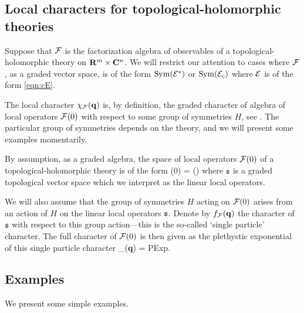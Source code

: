\subsection{Local characters for topological-holomorphic theories}\label{s:localchar}

Suppose that $\mathcal F$ is the factorization algebra of observables of a topological-holomorphic theory on $\mathbf{R}^m \times \mathbf{C}^n$. 
We will restrict our attention to cases where $\mathcal F$, as a graded vector space, is of the form $\operatorname{Sym}(\mathcal E^*)$ or $\operatorname{Sym}(\mathcal E_c)$ where $\mathcal E$ is of the form \eqref{eqn:cE}.

The local character $\chi_\mathcal F ({\bf q})$ is, by definition, the graded character of algebra of local operators $\mathcal F(0)$ with respect to some group of symmetries $H$, see \cite{SWchar}.
The particular group of symmetries depends on the theory, and we will present some examples momentarily. 

By assumption, as a graded algebra, the space of local operators $\mathcal F(0)$ of a topological-holomorphic theory is of the form
\beqn
\cF(0) = \Sym ()
\eeqn
where $\mathfrak{s}$ is a graded topological vector space which we interpret as the linear local operators.

We will also assume that the group of symmetries $H$ acting on $\mathcal F(0)$ arises from an action of $H$ on the linear local operators $\mathfrak{s}$. 
Denote by $f_{\mathcal F}({\bf q})$ the character of $\mathfrak{s}$ with respect to this group action---this is the so-called `single particle' character. 
The full character of $\mathcal F(0)$ is then given as the plethystic exponential of this single particle character
\beqn
\chi_{\cF}({\bf q}) = {\rm PExp}\left[f_{\cF}({\bf q}) \right] .
\eeqn

\subsection{Examples}

We present some simple examples. 

